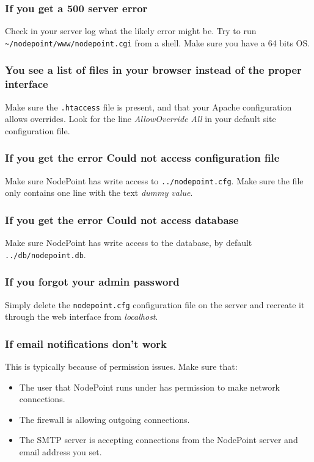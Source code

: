 \documentclass[11pt]{article}
\begin{document}
{
\subsubsection{If you get a 500 server error}

Check in your server log what the likely error might be. Try to run \texttt{\textasciitilde/nodepoint/www/nodepoint.cgi} from a shell. Make sure you have a 64 bits OS.

\subsubsection{You see a list of files in your browser instead of the proper interface}

Make sure the \texttt{.htaccess} file is present, and that your Apache configuration allows overrides. Look for the line \textit{AllowOverride All} in your default site configuration file.

\subsubsection{If you get the error Could not access configuration file}

Make sure NodePoint has write access to \texttt{../nodepoint.cfg}. Make sure the file only contains one line with the text \textit{dummy value}.

\subsubsection{If you get the error Could not access database}

Make sure NodePoint has write access to the database, by default \texttt{../db/nodepoint.db}.

\subsubsection{If you forgot your admin password}

Simply delete the \texttt{nodepoint.cfg} configuration file on the server and recreate it through the web interface from \textit{localhost}.
}

\subsubsection{If email notifications don't work}

This is typically because of permission issues. Make sure that:
\begin{itemize}
\item The user that NodePoint runs under has permission to make network connections.
\item The firewall is allowing outgoing connections.
\item The SMTP server is accepting connections from the NodePoint server and email address you set.
\end{itemize}
\end{document}
